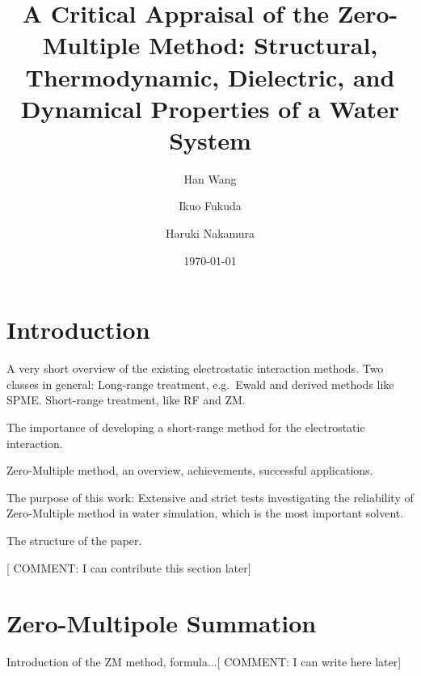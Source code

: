 \documentclass[a4paper,preprint,unsortedaddress,onecolumn,fleqn]{revtex4}
\begin{document}
\title{A Critical Appraisal of the Zero-Multiple Method: Structural,
Thermodynamic, Dielectric, and Dynamical Properties of a Water System}
\author{Han Wang}
\author{Ikuo Fukuda}
\author{Haruki Nakamura}
\date{\today}

\begin{abstract}
\end{abstract}

\maketitle
{}


\section{Introduction}

A very short overview of the existing electrostatic interaction methods. Two
classes in general: Long-range treatment, e.g.~Ewald and derived methods
like SPME. Short-range treatment, like RF and ZM.

The importance of developing a short-range method for the electrostatic
interaction.

Zero-Multiple method, an overview, achievements, successful applications.

The purpose of this work: Extensive and strict tests investigating the
reliability of Zero-Multiple method in water simulation, which is the most
important solvent.

The structure of the paper.

[{\color{blue} COMMENT: I can contribute this section later}]

\section{Zero-Multipole Summation}

Introduction of the ZM method, formula...[ {\color{blue} COMMENT: I can
write here later}]
\end{document}
